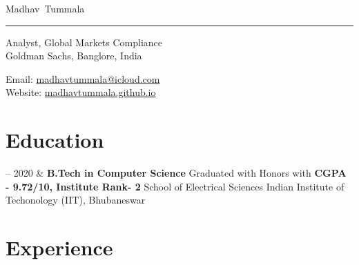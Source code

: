 \documentclass[10pt, a4paper]{article}
\makeatletter
\newcommand{\GS}{Goldman Sachs, Banglore, India}
\newcommand{\IITBBS}{Indian Institute of Techonology (IIT), Bhubaneswar}
\newcommand{\SES}{School of Electrical Sciences}
\newcommand{\IR}{Institute Rank}
\newcommand{\FirstName}{Madhav}
\newcommand{\LastName}{Tummala}
\newcommand{\MyName}{\FirstName\ \LastName}
\newcommand{\Email}{madhavtummala@icloud.com}
\newcommand{\PersonalWebsite}{madhavtummala.github.io}
\newcommand{\POS}{Analyst, Global Markets Compliance}
\newcommand{\Affiliation}{\POS \\ \GS}
\newcommand{\Duration}[1]{\fontsize{10pt}{0}\selectfont #1}
\newcommand{\Appointment}[2]{\textbf{#1} \newline #2}
\makeatother
\begin{document}
\thispagestyle{empty}

{\fontsize{22pt}{0}\selectfont\MyName}\\[-0.1cm]
\rule{\textwidth}{0.2pt}
\begin{minipage}[t]{0.595\textwidth}
  \Affiliation
\end{minipage}
\begin{minipage}[t]{0.405\textwidth}
  \begin{flushright}
    Email: \href{mailto:\Email}{\Email}
    \\
    Website: \href{https://\PersonalWebsite}{\PersonalWebsite}
  \end{flushright}
\end{minipage}

\section{Education}

\begin{EntriesTable}
  \Duration{2016 -- 2020}  &
  \Appointment{B.Tech in Computer Science}
	{Graduated with Honors with \textbf{CGPA - 9.72/10, \IR  - 2}}
  \newline
	{\SES}
  \newline
	{\IITBBS}
\end{EntriesTable}

\vspace*{-.2\baselineskip}


\section{Experience}
\end{document}
